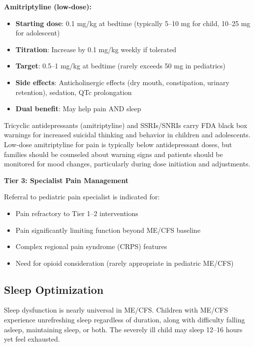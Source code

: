 \begin{protocol}
\textbf{Amitriptyline (low-dose):}
\begin{itemize}
    \item \textbf{Starting dose}: 0.1 mg/kg at bedtime (typically 5--10 mg for child, 10--25 mg for adolescent)
    \item \textbf{Titration}: Increase by 0.1 mg/kg weekly if tolerated
    \item \textbf{Target}: 0.5--1 mg/kg at bedtime (rarely exceeds 50 mg in pediatrics)
    \item \textbf{Side effects}: Anticholinergic effects (dry mouth, constipation, urinary retention), sedation, QTc prolongation
    \item \textbf{Dual benefit}: May help pain AND sleep
\end{itemize}

\begin{practicalwarning}
Tricyclic antidepressants (amitriptyline) and SSRIs/SNRIs carry FDA black box warnings for increased suicidal thinking and behavior in children and adolescents. Low-dose amitriptyline for pain is typically below antidepressant doses, but families should be counseled about warning signs and patients should be monitored for mood changes, particularly during dose initiation and adjustments.
\end{practicalwarning}

\textbf{Tier 3: Specialist Pain Management}

Referral to pediatric pain specialist is indicated for:
\begin{itemize}
    \item Pain refractory to Tier 1--2 interventions
    \item Pain significantly limiting function beyond ME/CFS baseline
    \item Complex regional pain syndrome (CRPS) features
    \item Need for opioid consideration (rarely appropriate in pediatric ME/CFS)
\end{itemize}
\end{protocol}

\subsection{Sleep Optimization}
\label{subsec:ped-severe-sleep}

Sleep dysfunction is nearly universal in ME/CFS. Children with ME/CFS experience unrefreshing sleep regardless of duration, along with difficulty falling asleep, maintaining sleep, or both. The severely ill child may sleep 12--16 hours yet feel exhausted.

